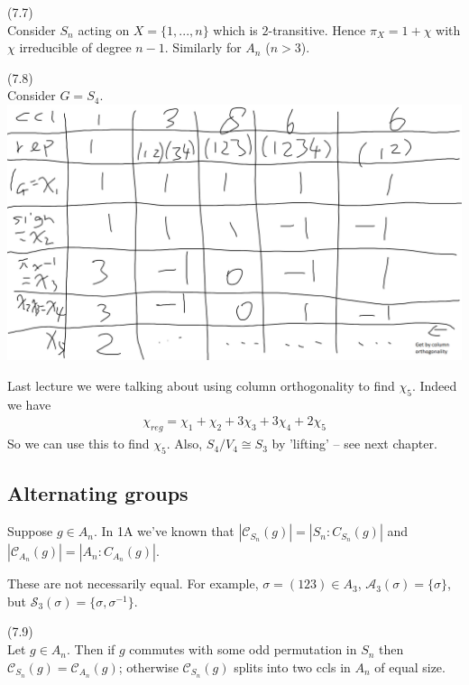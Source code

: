 \documentclass[a4paper]{article}
\begin{document}
\begin{eg} (7.7)\\
Consider $S_n$ acting on $X=\{1,...,n\}$ which is $2$-transitive. Hence $\pi_X =1+\chi$ with $\chi$ irreducible of degree $n-1$. Similarly for $A_n$ ($n>3$).
\end{eg}

\begin{eg} (7.8)\\
Consider $G=S_4$.\\
\includegraphics[scale=0.6]{image/Rep_04.png}
\end{eg}

Last lecture we were talking about using column orthogonality to find $\chi_5$. Indeed we have 
\begin{equation*}
\begin{aligned}
\chi_{reg} = \chi_1+\chi_2+3\chi_3+3\chi_4+2\chi_5
\end{aligned}
\end{equation*}
So we can use this to find $\chi_5$. Also, $S_4 / V_4 \cong S_3$ by 'lifting' -- see next chapter.


\subsection{Alternating groups}
Suppose $g \in A_n$. In 1A we've known that $|\mathcal{C}_{S_n} (g)| = |S_n:C_{S_n}(g)|$ and $|\mathcal{C}_{A_n}(g)| = |A_n : C_{A_n}(g)|$.

These are not necessarily equal. For example, $\sigma=(123) \in A_3$, $\mathcal{A}_3 (\sigma) =\{\sigma\}$, but $\mathcal{S_3}(\sigma) = \{\sigma,\sigma^{-1}\}$.

\begin{lemma} (7.9)\\
Let $g \in A_n$. Then if $g$ commutes with some odd permutation in $S_n$ then $\mathcal{C}_{S_n} (g) = \mathcal{C}_{A_n}(g)$; otherwise $\mathcal{C}_{S_n}(g)$ splits into two ccls in $A_n$ of equal size.
\end{lemma}
\end{document}
